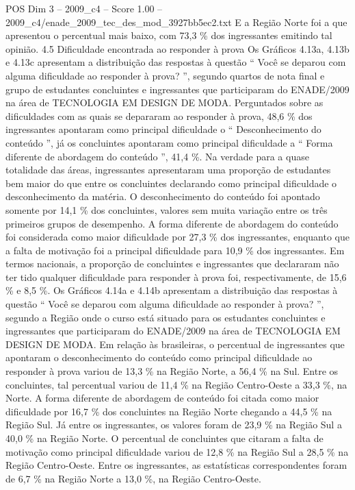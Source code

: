 \begin{textsample}{POS Dim 3 – 2009\_c4 – Score 1.00 – 2009\_c4/enade\_2009\_tec\_des\_mod\_3927bb5ec2.txt}
E a Região Norte foi a que apresentou o percentual mais baixo, com 73,3 \% dos ingressantes emitindo tal opinião. 4.5 Dificuldade encontrada ao responder à prova Os Gráficos 4.13a, 4.13b e 4.13c apresentam a distribuição das respostas à questão “ Você se deparou com alguma dificuldade ao responder à prova? ”, segundo quartos de nota final e grupo de estudantes concluintes e ingressantes que participaram do ENADE/2009 na área de TECNOLOGIA EM DESIGN DE MODA.
Perguntados sobre as dificuldades com as quais se depararam ao responder à prova, 48,6 \% dos ingressantes apontaram como principal dificuldade o “ Desconhecimento do conteúdo ”, já os concluintes apontaram como principal dificuldade a “ Forma diferente de abordagem do conteúdo ”, 41,4 \%.
Na verdade para a quase totalidade das áreas, ingressantes apresentaram uma proporção de estudantes bem maior do que entre os concluintes declarando como principal dificuldade o desconhecimento da matéria.
O desconhecimento do conteúdo foi apontado somente por 14,1 \% dos concluintes, valores sem muita variação entre os três primeiros grupos de desempenho.
A forma diferente de abordagem do conteúdo foi considerada como maior dificuldade por 27,3 \% dos ingressantes, enquanto que a falta de motivação foi a principal dificuldade para 10,9 \% dos ingressantes.
Em termos nacionais, a proporção de concluintes e ingressantes que declararam não ter tido qualquer dificuldade para responder à prova foi, respectivamente, de 15,6 \% e 8,5 \%.
Os Gráficos 4.14a e 4.14b apresentam a distribuição das respostas à questão “ Você se deparou com alguma dificuldade ao responder à prova? ”, segundo a Região onde o curso está situado para os estudantes concluintes e ingressantes que participaram do ENADE/2009 na área de TECNOLOGIA EM DESIGN DE MODA.
Em relação às brasileiras, o percentual de ingressantes que apontaram o desconhecimento do conteúdo como principal dificuldade ao responder à prova variou de 13,3 \% na Região Norte, a 56,4 \% na Sul.
Entre os concluintes, tal percentual variou de 11,4 \% na Região Centro-Oeste a 33,3 \%, na Norte.
A forma diferente de abordagem de conteúdo foi citada como maior dificuldade por 16,7 \% dos concluintes na Região Norte chegando a 44,5 \% na Região Sul.
Já entre os ingressantes, os valores foram de 23,9 \% na Região Sul a 40,0 \% na Região Norte.
O percentual de concluintes que citaram a falta de motivação como principal dificuldade variou de 12,8 \% na Região Sul a 28,5 \% na Região Centro-Oeste.
Entre os ingressantes, as estatísticas correspondentes foram de 6,7 \% na Região Norte a 13,0 \%, na Região Centro-Oeste.

\end{textsample}
